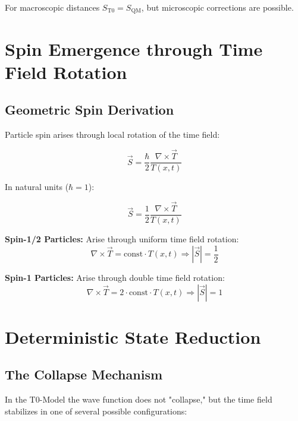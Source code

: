 \documentclass[12pt,a4paper]{report}
\newcommand{\Tfield}{T(x,t)}  %
\begin{document}
	For macroscopic distances $S_{\text{T0}} = S_{\text{QM}}$, but microscopic corrections are possible.
	
	\section{Spin Emergence through Time Field Rotation}\label{sec:spin_emergence}
	
	\subsection{Geometric Spin Derivation}\label{subsec:geometric_spin_derivation}
	
	Particle spin arises through local rotation of the time field:
	
	\begin{equation}\label{eq:spin_timefield}
		\vec{S} = \frac{\hbar}{2} \frac{\nabla \times \vec{T}}{\Tfield}
	\end{equation}
	
	In natural units ($\hbar = 1$):
	
	\begin{equation}\label{eq:spin_timefield_nat}
		\vec{S} = \frac{1}{2} \frac{\nabla \times \vec{T}}{\Tfield}
	\end{equation}
	
	\textbf{Spin-1/2 Particles:}
	Arise through uniform time field rotation:
	\begin{equation}
		\nabla \times \vec{T} = \text{const} \cdot \Tfield \Rightarrow |\vec{S}| = \frac{1}{2}
	\end{equation}
	
	\textbf{Spin-1 Particles:}
	Arise through double time field rotation:
	\begin{equation}
		\nabla \times \vec{T} = 2 \cdot \text{const} \cdot \Tfield \Rightarrow |\vec{S}| = 1
	\end{equation}
	
	\section{Deterministic State Reduction}\label{sec:deterministic_state_reduction}
	
	\subsection{The Collapse Mechanism}\label{subsec:collapse_mechanism}
	
	In the T0-Model the wave function does not "collapse," but the time field stabilizes in one of several possible configurations:
	
\end{document}
